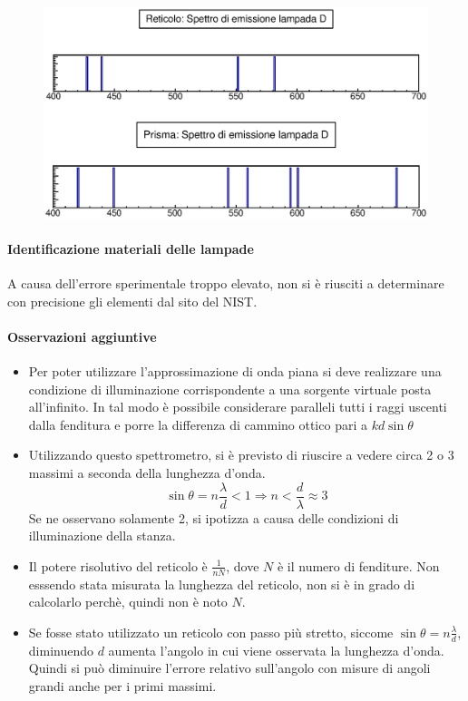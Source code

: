     \begin{figure}[H]
    \centering
    \includegraphics[scale=0.8]{Grafici/O3_C_lampadaD_spectrum.eps}
    \label{fig:C3_P2_RL}
    \end{figure} 
%
%
\paragraph{Identificazione materiali delle lampade}{
A causa dell'errore sperimentale troppo elevato, non si è riusciti a determinare con precisione gli elementi dal sito del NIST.}

\paragraph{Osservazioni aggiuntive}
\begin{itemize}
    \item Per poter utilizzare l’approssimazione di onda piana si deve realizzare una condizione di illuminazione corrispondente a una sorgente virtuale posta all’infinito. In tal modo è possibile considerare paralleli tutti i raggi uscenti dalla fenditura e porre la differenza di cammino ottico pari a $k d \sin\theta $
    \item Utilizzando questo spettrometro, si è previsto di riuscire a vedere circa 2 o 3 massimi a seconda della lunghezza d’onda.
    $$\sin\theta = n\frac{\lambda}{d} < 1 \Rightarrow n < \frac{d}{\lambda} \approx 3 $$
    Se ne osservano solamente 2, si ipotizza a causa delle condizioni di illuminazione della stanza.
    \item Il potere risolutivo del reticolo è $\frac{1}{nN}$, dove $N$ è il numero di fenditure. Non esssendo stata misurata la lunghezza del reticolo, non si è in grado di calcolarlo perchè, quindi non è noto $N$.
    \item Se fosse stato utilizzato un reticolo con passo più stretto, siccome $\sin\theta = n \frac{\lambda}{d}$, diminuendo $d$ aumenta l’angolo in cui viene osservata la lunghezza d’onda. Quindi si può diminuire l’errore relativo sull’angolo con misure di angoli grandi anche per i primi massimi.    
\end{itemize}
